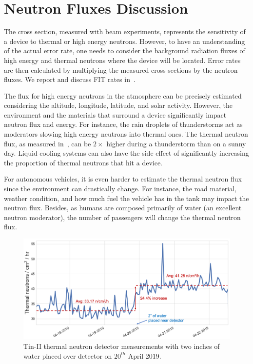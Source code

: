 
\section{Neutron Fluxes Discussion}
\label{sec_fit}

The cross section, measured with beam experiments, represents the sensitivity of a device to thermal or high energy neutrons. However, to have an understanding of the actual error rate, one needs to consider the background radiation fluxes of high energy and thermal neutrons where the device will be located. Error rates are then calculated by multiplying the measured cross sections by the neutron fluxes. We report and discuss FIT rates in~\cite{jsc2020}.

The flux for high energy neutrons in the atmosphere can be precisely estimated considering the altitude, longitude, latitude, and solar activity. However, the environment and the materials that surround a device significantly impact neutron flux and energy.  For instance, the rain droplets of thunderstorms act as moderators slowing high energy neutrons into thermal ones. The thermal neutron flux, as measured in~\cite{ziegler2003}, can be $2\times$ higher during a thunderstorm than on a sunny day. Liquid cooling systems can also have the side effect of significantly increasing the proportion of thermal neutrons that hit a device.

For autonomous vehicles, it is even harder to estimate the thermal neutron flux since the environment can drastically change. For instance, the road material, weather condition, and how much fuel the vehicle has in the tank may impact the neutron flux. Besides, as humans are composed primarily of water (an excellent neutron moderator), the number of passengers will change the thermal neutron flux.

\begin{figure}[tb] 
\centering
\includegraphics[width=0.82\columnwidth]{./figs/turkeypan_PR}
\caption{Tin-II thermal neutron detector measurements with two inches of water placed over detector on $20^{th}$ April 2019.}
\label{turkeypan}

\end{figure}
\label{sub_flux}

